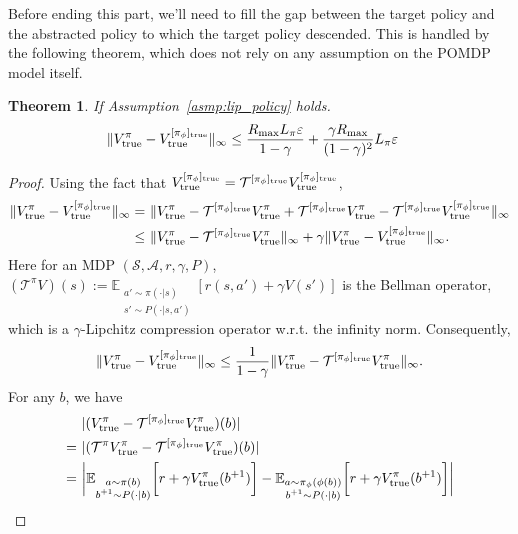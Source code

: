 \documentclass[twoside]{article}
\newtheorem{theorem}{Theorem}
\newcommand{\CAL}[1]{\mathcal{#1}}
\begin{document}
    
    Before ending this part, we'll need to fill the gap between the target policy and the abstracted policy to which the target policy descended. This is handled by the following theorem, which does not rely on any assumption on the POMDP model itself.
    \begin{theorem}\label{Thm:policy_abstract_error}
If Assumption~\ref{asmp:lip_policy} holds.
    \begin{align}
        \|V_{\rm true}^{\pi}-V_{\rm true}^{[\pi_\phi]_{\rm true}}\|_\infty&\leq \frac{R_{\rm max}L_\pi\varepsilon}{1-\gamma}+\frac{\gamma R_{\rm max}}{(1-\gamma)^2}L_\pi\varepsilon
    \end{align}
    \end{theorem}
\begin{proof}
    Using the fact that $V_{\rm true}^{[\pi_\phi]_{\rm true}}=\mathcal{T}^{[\pi_\phi]_{\rm true}} V_{\rm true}^{[\pi_\phi]_{\rm true}}$,
    \begin{align}
        \|V_{\rm true}^{\pi}-V_{\rm true}^{[\pi_\phi]_{\rm true}}\|_\infty=&\ \|V_{\rm true}^{\pi}-\mathcal{T}^{[\pi_\phi]_{\rm true}} V_{\rm true}^{\pi}+\mathcal{T}^{[\pi_\phi]_{\rm true}} V_{\rm true}^{\pi}-\mathcal{T}^{[\pi_\phi]_{\rm true}} V_{\rm true}^{[\pi_\phi]_{\rm true}}\|_\infty    \nonumber\\
        \leq&\ \|V_{\rm true}^{\pi}-\mathcal{T}^{[\pi_\phi]_{\rm true}} V_{\rm true}^{\pi}\|_\infty+\gamma\|V_{\rm true}^{\pi}-V_{\rm true}^{[\pi_\phi]_{\rm true}}\|_\infty.
    \end{align} 
    Here for an MDP $(\CAL{S},\CAL{A},r,\gamma,P)$, $(\CAL{T}^\pi V)(s):=\mathbb{E}_{\substack{a'\sim\pi(\cdot|s)\\s'\sim P(\cdot|s,a')}}[r(s,a')+\gamma V(s')]$ is the Bellman operator, which is a $\gamma$-Lipchitz compression operator w.r.t. the infinity norm. Consequently,
    \begin{align}
        \|V_{\rm true}^{\pi}-V_{\rm true}^{[\pi_\phi]_{\rm true}}\|_\infty\leq \frac{1}{1-\gamma}\|V_{\rm true}^{\pi}-\mathcal{T}^{[\pi_\phi]_{\rm true}} V_{\rm true}^{\pi}\|_\infty.
    \end{align}
    For any $b$, we have
    \begin{align}
        &\ |(V_{\rm true}^{\pi}-\mathcal{T}^{[\pi_\phi]_{\rm true}} V_{\rm true}^{\pi})(b)|\nonumber\\
        =&\ |(\mathcal{T}^\pi V_{\rm true}^{\pi}-\mathcal{T}^{[\pi_\phi]_{\rm true}} V_{\rm true}^{\pi})(b)|\nonumber\\
        =&\ \bigg|\mathbb{E}_{\substack{a\sim\pi(b)\\ b^{+1}\sim P(\cdot|b)}}\bigg[r+\gamma V_{\rm true}^\pi(b^{+1})\bigg]-\mathbb{E}_{\substack{a\sim\pi_\phi(\phi(b))\\ b^{+1}\sim P(\cdot|b)}}\bigg[r+\gamma V_{\rm true}^\pi(b^{+1})\bigg]\bigg|

\end{align}
\end{proof}
\end{document}
